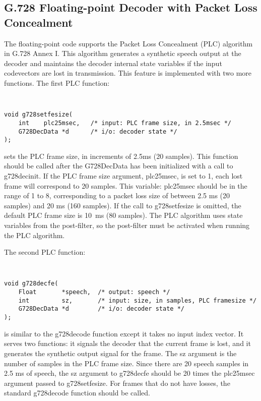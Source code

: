 \subsection {G.728 Floating-point Decoder with Packet Loss Concealment}

The floating-point code supports the Packet Loss Concealment (PLC) algorithm
in G.728 Annex I. This algorithm generates a synthetic
speech output at the decoder and maintains the decoder internal
state variables if the input codevectors are lost in transmission.
This feature is implemented with two more functions. The first PLC function:

{\tt\small
\begin{verbatim}
void g728setfesize(
    int    plc25msec,   /* input: PLC frame size, in 2.5msec */
    G728DecData *d      /* i/o: decoder state */
);	
\end{verbatim}
}

sets the PLC frame size, in increments of 2.5ms (20 samples).  This
function should be called after the G728DecData has been initialized
with a call to g728decinit. If the PLC frame size argument, plc25msec,
is set to 1, each lost frame will correspond to 20 samples. This
variable: plc25msec should be in the range of 1 to 8, corresponding to
a packet loss size of between 2.5 ms (20 samples) and 20 ms (160
samples). If the call to g728setfesize is omitted, the default PLC
frame size is 10~ms (80 samples). The PLC algorithm uses state
variables from the post-filter, so the post-filter must be activated
when running the PLC algorithm.

The second PLC function:

{\tt\small
\begin{verbatim}
void g728decfe(
    Float       *speech,  /* output: speech */
    int         sz,       /* input: size, in samples, PLC framesize */
    G728DecData *d        /* i/o: decoder state */	
);
\end{verbatim}
}

is similar to the g728decode function except it takes no input index vector.
It serves two functions: it signals the decoder that the current frame
is lost, and it generates the synthetic output signal for the frame.
The sz argument is the number of samples in the PLC frame size.
Since there are 20 speech samples in 2.5 ms of speech, the sz argument to
g728decfe should be 20 times the plc25msec argument passed to g728setfesize.
For frames that do not have losses, the standard g728decode function should
be called.

